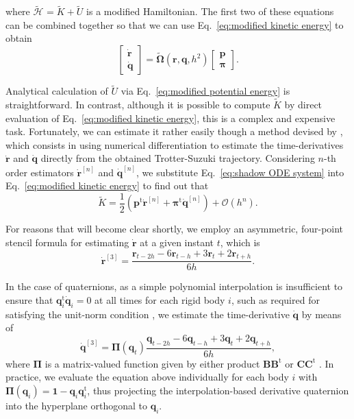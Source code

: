 \documentclass[
journal=jctcce,
layout=twocolumn
]{achemso}
\newcommand{\mt}[1]{\boldsymbol{\mathbf{#1}}}   %
\newcommand{\vt}[1]{\boldsymbol{\mathbf{#1}}}   %
\newcommand{\tr}[1]{#1^\text{t}}                %
\newcommand{\Ham}[1]{{\mathcal H}_\text{#1}}    %
\newcommand{\timestep}{h}
\newcommand{\modified}[1]{\widetilde{#1}}
\begin{document}
where $\modified{\Ham{}} = \modified K + \modified U$ is a modified Hamiltonian. The first two of these equations can be combined together so that we can use Eq.~\eqref{eq:modified kinetic energy} to obtain
\begin{equation}
\label{eq:shadow ODE system}
\left[\begin{array}{c} \dot{\vt r} \\ \dot{\vt q} \end{array}\right] = \modified{\mathbf \Omega}(\vt r, \vt q, \timestep^2) \left[\begin{array}{c} \vt p \\ \vt \pi \end{array}\right].
\end{equation}

Analytical calculation of $\modified U$ via Eq.~\eqref{eq:modified potential energy} is straightforward. In contrast, although it is possible to compute $\modified K$ by direct evaluation of Eq.~\eqref{eq:modified kinetic energy}, this is a complex and expensive task. Fortunately, we can estimate it rather easily though a method devised by \citeauthor{Eastwood_2010} \cite{Eastwood_2010}, which consists in using numerical differentiation to estimate the time-derivatives $\dot{\vt r}$ and $\dot{\vt q}$ directly from the obtained Trotter-Suzuki trajectory. Considering $n$-th order estimators $\dot{\vt r}^{[n]}$ and $\dot{\vt q}^{[n]}$, we substitute Eq.~\eqref{eq:shadow ODE system} into Eq.~\eqref{eq:modified kinetic energy} to find out that
\begin{equation}
\label{eq:modified kinetic energy estimator}
\modified K = \frac{1}{2} \left( \tr{\vt p} \dot{\vt r}^{[n]} + \tr{\vt \pi} \dot{\vt q}^{[n]} \right) + \mathcal{O}(h^n).
\end{equation}

For reasons that will become clear shortly, we employ an asymmetric, four-point stencil formula for estimating $\dot{\vt r}$ at a given instant $t$, which is
\begin{equation*}
\dot{\vt r}^{[3]} = \frac{{\vt r}_{t-2\timestep} - 6 {\vt r}_{t-\timestep} + 3 {\vt r}_t + 2 {\vt r}_{t+\timestep}}{6\timestep}.
\end{equation*}

In the case of quaternions, as a simple polynomial interpolation is insufficient to ensure that $\tr{\vt q}_i \dot{\vt q}_i = 0$ at all times for each rigid body $i$, such as required for satisfying the unit-norm condition \cite{Silveira_2017}, we estimate the time-derivative $\dot{\vt q}$ by means of\cite{Schay_1995}
\begin{equation*}
\dot{\vt q}^{[3]} = {\mt \Pi}({\vt q}_t) \frac{{\vt q}_{t-2\timestep} - 6 {\vt q}_{t-\timestep} + 3 {\vt q}_t + 2 {\vt q}_{t+\timestep}}{6\timestep},
\end{equation*}
where ${\mt \Pi}$ is a matrix-valued function given by either product ${\mt B}\tr{\mt B}$ or ${\mt C}\tr{\mt C}$ \cite{Silveira_2017}. In practice, we evaluate the equation above individually for each body $i$ with ${\mt \Pi}({\vt q}_i) = {\mt 1} - {\vt q}_i \tr{\vt q}_i$, thus projecting the interpolation-based derivative quaternion into the hyperplane orthogonal to ${\vt q}_i$.
\end{document}
